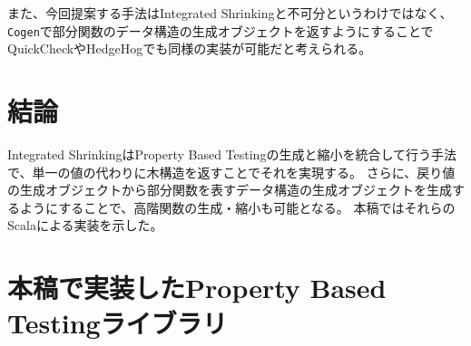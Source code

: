 \documentclass[a4paper,xelatex,ja=standard,jafont=noto]{bxjsarticle}
\theoremstyle{definition}
\begin{document}
また、今回提案する手法はIntegrated Shrinkingと不可分というわけではなく、\texttt{Cogen}で部分関数のデータ構造の生成オブジェクトを返すようにすることでQuickCheckやHedgeHogでも同様の実装が可能だと考えられる。

\section{結論}

Integrated ShrinkingはProperty Based Testingの生成と縮小を統合して行う手法で、単一の値の代わりに木構造を返すことでそれを実現する。
さらに、戻り値の生成オブジェクトから部分関数を表すデータ構造の生成オブジェクトを生成するようにすることで、高階関数の生成・縮小も可能となる。
本稿ではそれらのScalaによる実装を示した。



\appendix

\section{本稿で実装したProperty Based Testingライブラリ}\label{sec:appndix-1}

\inputminted[breaklines]{scala}{../src/main/scala/minicheck.scala}
\end{document}
